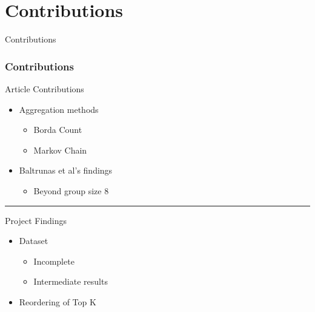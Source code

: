 \section{Contributions}
\begin{frame}
     \begin{center}
     	\huge Contributions
     \end{center}
\end{frame}

\begin{frame}
\frametitle{Contributions}
Article Contributions
\begin{itemize}
	\item Aggregation methods
	\begin{itemize}
		\item Borda Count
		\item Markov Chain
	\end{itemize}
	\item Baltrunas et al's findings
	\begin{itemize}
		\item Beyond group size 8
	\end{itemize}
\end{itemize}
\hrule \smallskip
Project Findings
\begin{itemize}
	\item Dataset
	\begin{itemize}
		\item Incomplete
		\item Intermediate results
	\end{itemize}
	\item Reordering of Top K
\end{itemize}
\end{frame}